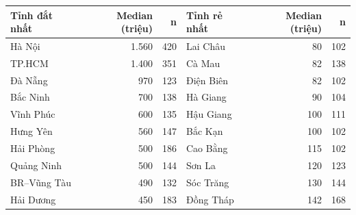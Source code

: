 \begin{tabular}{lrrlrr}
\toprule
Tỉnh đắt nhất & Median (triệu) & n & Tỉnh rẻ nhất & Median (triệu) & n \\
\midrule
Hà Nội & 1.560 & 420 & Lai Châu & 80 & 102 \\
TP.HCM & 1.400 & 351 & Cà Mau & 82 & 138 \\
Đà Nẵng & 970 & 123 & Điện Biên & 82 & 102 \\
Bắc Ninh & 700 & 138 & Hà Giang & 90 & 104 \\
Vĩnh Phúc & 600 & 135 & Hậu Giang & 100 & 111 \\
Hưng Yên & 560 & 147 & Bắc Kạn & 100 & 102 \\
Hải Phòng & 500 & 186 & Cao Bằng & 115 & 102 \\
Quảng Ninh & 500 & 144 & Sơn La & 120 & 123 \\
BR–Vũng Tàu & 490 & 132 & Sóc Trăng & 130 & 144 \\
Hải Dương & 450 & 183 & Đồng Tháp & 142 & 168 \\
\bottomrule
\end{tabular}
